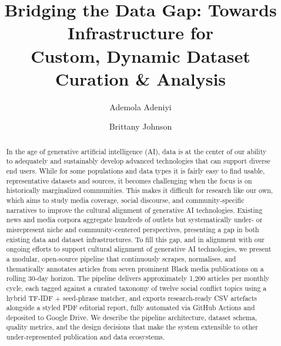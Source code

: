 \documentclass[sigconf,anonymous]{acmart}
\begin{document}
\title{Bridging the Data Gap: Towards Infrastructure for\\
       Custom, Dynamic Dataset Curation \& Analysis}

\author{Ademola Adeniyi}

\author{Brittany Johnson}

\begin{abstract}
In the age of generative artificial intelligence (AI), data is at the center of
our ability to adequately and sustainably develop advanced technologies that can
support diverse end users.
While for some populations and data types it is fairly easy to find usable,
representative datasets and sources, it becomes challenging when the focus is on
historically marginalized communities.
This makes it difficult for research like our own, which aims to study media
coverage, social discourse, and community-specific narratives to improve the
cultural alignment of generative AI technologies.
Existing news and media corpora aggregate hundreds of outlets but systematically
under- or misrepresent niche and community-centered perspectives, presenting a
gap in both existing data and dataset infrastructures.
To fill this gap, and in alignment with our ongoing efforts to support cultural
alignment of generative AI technologies, we present a modular, open-source
pipeline that continuously scrapes, normalises, and thematically annotates
articles from seven prominent Black media publications on a rolling 30-day
horizon.
The pipeline delivers approximately 1,200 articles per monthly cycle, each tagged
against a curated taxonomy of twelve social conflict topics using a hybrid
TF-IDF + seed-phrase matcher, and exports research-ready CSV artefacts alongside
a styled PDF editorial report, fully automated via GitHub Actions and deposited
to Google Drive.
We describe the pipeline architecture, dataset schema, quality metrics, and the
design decisions that make the system extensible to other under-represented
publication and data ecosystems.
\end{abstract}
\end{document}
